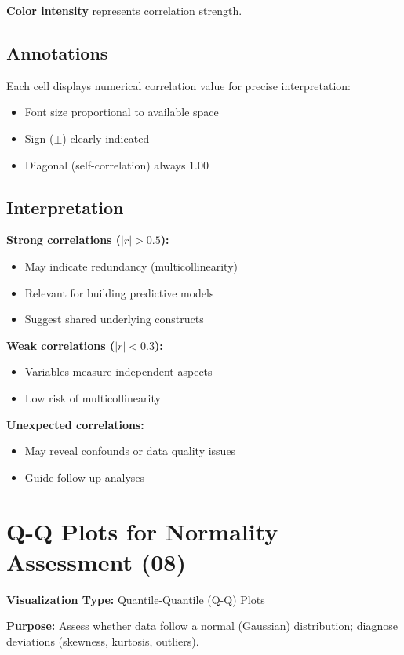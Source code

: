 \documentclass[12pt,a4paper]{article}
\begin{document}
\textbf{Color intensity} represents correlation strength.

\subsection{Annotations}

Each cell displays numerical correlation value for precise interpretation:
\begin{itemize}
    \item Font size proportional to available space
    \item Sign ($\pm$) clearly indicated
    \item Diagonal (self-correlation) always 1.00
\end{itemize}

\subsection{Interpretation}

\textbf{Strong correlations ($|r| > 0.5$):}
\begin{itemize}
    \item May indicate redundancy (multicollinearity)
    \item Relevant for building predictive models
    \item Suggest shared underlying constructs
\end{itemize}

\textbf{Weak correlations ($|r| < 0.3$):}
\begin{itemize}
    \item Variables measure independent aspects
    \item Low risk of multicollinearity
\end{itemize}

\textbf{Unexpected correlations:}
\begin{itemize}
    \item May reveal confounds or data quality issues
    \item Guide follow-up analyses
\end{itemize}

\newpage
\section{Q-Q Plots for Normality Assessment (08)}

\textbf{Visualization Type:} Quantile-Quantile (Q-Q) Plots

\textbf{Purpose:} Assess whether data follow a normal (Gaussian) distribution; diagnose deviations (skewness, kurtosis, outliers).
\end{document}
